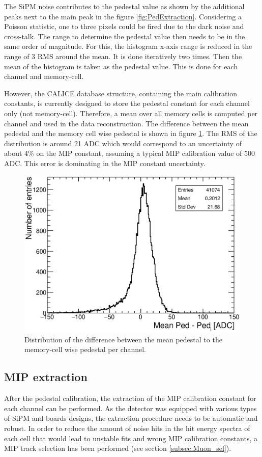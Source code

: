 The SiPM noise contributes to the pedestal value as shown by the additional peaks next to the main peak in the figure \ref{fig:PedExtraction}. Considering a Poisson statistic, one to three pixels could be fired due to the dark noise and cross-talk. The range to determine the pedestal value then needs to be in the same order of magnitude. For this, the histogram x-axis range is reduced in the range of 3 RMS around the mean. It is done iteratively two times. Then the mean of the histogram is taken as the pedestal value. This is done for each channel and memory-cell.

However, the CALICE database structure, containing the main calibration constants, is currently designed to store the pedestal constant for each channel only (not memory-cell). Therefore, a mean over all memory cells is computed per channel and used in the data reconstruction. The difference between the mean pedestal and the memory cell wise pedestal is shown in figure \ref{fig:CompMeanMem}. The RMS of the distribution is around 21 ADC which would correspond to an uncertainty of about 4\% on the MIP constant, assuming a typical MIP calibration value of 500 ADC. This error is dominating in the MIP constant uncertainty.

\begin{figure}[htbp!]
	\centering
	\includegraphics[width=0.6\linewidth]{../Thesis_Plots/EnergyCalib/Plots/ComparisonMeanPedtoMemorycell.eps}
	\caption{Distribution of the difference between the mean pedestal to the memory-cell wise pedestal per channel.} \label{fig:CompMeanMem}
\end{figure}

\subsection{MIP extraction}
\label{sec:MIPExtraction}

After the pedestal calibration, the extraction of the MIP calibration constant for each channel can be performed. As the detector was equipped with various types of SiPM and boards designs, the extraction procedure needs to be automatic and robust. In order to reduce the amount of noise hits in the hit energy spectra of each cell that would lead to unstable fits and wrong MIP calibration constants, a MIP track selection has been performed (see section \ref{subsec:Muon_sel}).

